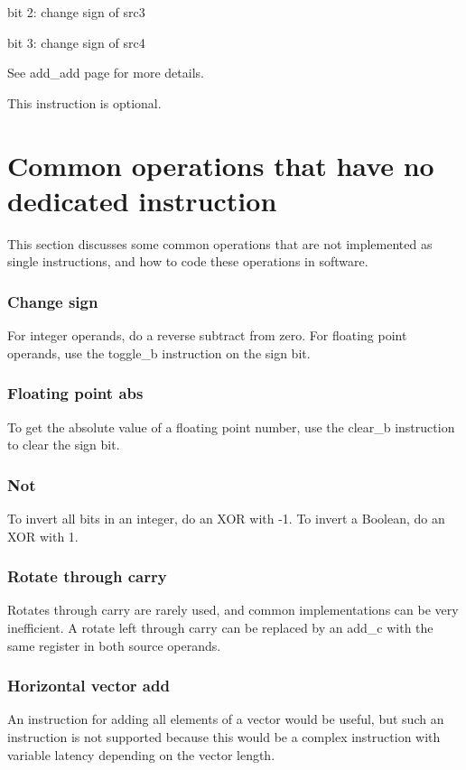 \documentclass[forwardcom.tex]{subfiles}
\begin{document}
bit 2: change sign of src3

bit 3: change sign of src4
\vspace{2mm}

See add\_add page \pageref{addAdd} for more details.
\vspace{2mm}

This instruction is optional.


\section{Common operations that have no dedicated instruction}
This section discusses some common operations that are not implemented as single instructions, and how to code these operations in software.

\subsubsection{Change sign}
For integer operands, do a reverse subtract from zero. For floating point operands, use the toggle\_b instruction on the sign bit.

\subsubsection{Floating point abs}
To get the absolute value of a floating point number, use the clear\_b instruction to clear the sign bit.

\subsubsection{Not}
To invert all bits in an integer, do an XOR with -1. To invert a Boolean, do an XOR with 1.

\subsubsection{Rotate through carry}
Rotates through carry are rarely used, and common implementations can be very inefficient. A rotate left through carry can be replaced by an add\_c with the same register in both source operands.

\subsubsection{Horizontal vector add} \label{horizontalVectorAdd}
An instruction for adding all elements of a vector would be useful, but such an instruction is not supported because this would be a complex instruction with variable latency depending on the vector length.
\vspace{2mm}
\end{document}
